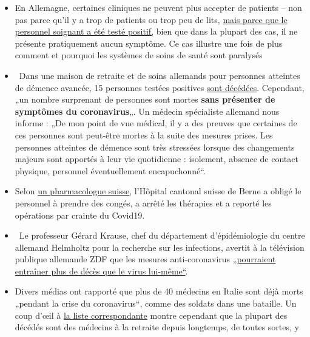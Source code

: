 \begin{itemize}
\tightlist
\item
  En Allemagne, certaines cliniques ne peuvent plus accepter de patients
  -- non pas parce qu'il y a trop de patients ou trop peu de lits,
  \href{https://www.sueddeutsche.de/panorama/coronavirus-news-deutschland-wolfsburg-laschet-1.4828033}{mais
  parce que le personnel soignant a été testé positif,} bien que dans la
  plupart des cas, il ne présente pratiquement aucun symptôme. Ce cas
  illustre une fois de plus comment et pourquoi les systèmes de soins de
  santé sont paralysés
\item
  ~Dans une maison de retraite et de soins allemands pour personnes
  atteintes de démence avancée, 15 personnes testées positives
  \href{https://www.sueddeutsche.de/panorama/coronavirus-news-deutschland-wolfsburg-laschet-1.4828033}{sont
  décédées}. Cependant, „un nombre surprenant de personnes sont mortes
  \textbf{sans présenter de symptômes du coronavirus}„. Un médecin
  spécialiste allemand nous informe : „De mon point de vue médical, il y
  a des preuves que certaines de ces personnes sont peut-être mortes à
  la suite des mesures prises. Les personnes atteintes de démence sont
  très stressées lorsque des changements majeurs sont apportés à leur
  vie quotidienne : isolement, absence de contact physique, personnel
  éventuellement encapuchonné``.
\item
  Selon \href{https://twitter.com/sneatio/status/1244157986832101376}{un
  pharmacologue suisse}, l'Hôpital cantonal suisse de Berne a obligé le
  personnel à prendre des congés, a arrêté les thérapies et a reporté
  les opérations par crainte du Covid19.
\item
  ~Le professeur Gérard Krause, chef du département d'épidémiologie du
  centre allemand Helmholtz pour la recherche sur les infections,
  avertit à la télévision publique allemande ZDF que les mesures
  anti-coronavirus
  „\href{https://www.zdf.de/nachrichten/politik/coronavirus-epidemiologe-folgen-helmholtz-100.html}{pourraient
  entraîner plus de décès que le virus lui-même``}.
\item
  Divers médias ont rapporté que plus de 40 médecins en Italie sont déjà
  morts „pendant la crise du coronavirus``, comme des soldats dans une
  bataille. Un coup d'œil à
  \href{https://portale.fnomceo.it/elenco-dei-medici-caduti-nel-corso-dellepidemia-di-covid-19/}{la
  liste correspondante} montre cependant que la plupart des décédés sont
  des médecins à la retraite depuis longtemps, de toutes sortes, y

\end{itemize}
